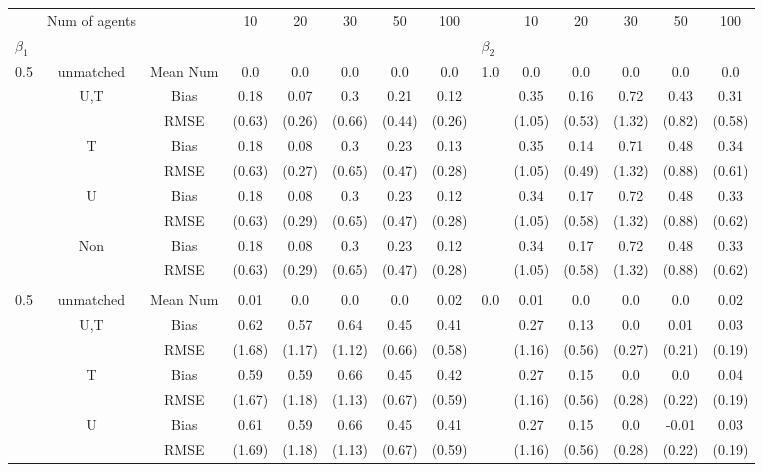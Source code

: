 \begin{tabular}{@{\extracolsep{5pt}}lc|cccccc|lccccc}
\toprule 
 & Num of agents &  & 10 & 20 & 30 & 50 & 100 &  & 10 & 20 & 30 & 50 & 100 \\
$\beta_1$ &  &  &  &  &  &  &  & $\beta_2$ &  &  &  &  &  \\
\midrule 
0.5 & unmatched & Mean Num & 0.0 & 0.0 & 0.0 & 0.0 & 0.0 & 1.0 & 0.0 & 0.0 & 0.0 & 0.0 & 0.0 \\
 & U,T & Bias & 0.18 & 0.07 & 0.3 & 0.21 & 0.12 &  & 0.35 & 0.16 & 0.72 & 0.43 & 0.31 \\
 &  & RMSE & (0.63) & (0.26) & (0.66) & (0.44) & (0.26) &  & (1.05) & (0.53) & (1.32) & (0.82) & (0.58) \\
 & T & Bias & 0.18 & 0.08 & 0.3 & 0.23 & 0.13 &  & 0.35 & 0.14 & 0.71 & 0.48 & 0.34 \\
 &  & RMSE & (0.63) & (0.27) & (0.65) & (0.47) & (0.28) &  & (1.05) & (0.49) & (1.32) & (0.88) & (0.61) \\
 & U & Bias & 0.18 & 0.08 & 0.3 & 0.23 & 0.12 &  & 0.34 & 0.17 & 0.72 & 0.48 & 0.33 \\
 &  & RMSE & (0.63) & (0.29) & (0.65) & (0.47) & (0.28) &  & (1.05) & (0.58) & (1.32) & (0.88) & (0.62) \\
 & Non & Bias & 0.18 & 0.08 & 0.3 & 0.23 & 0.12 &  & 0.34 & 0.17 & 0.72 & 0.48 & 0.33 \\
 &  & RMSE & (0.63) & (0.29) & (0.65) & (0.47) & (0.28) &  & (1.05) & (0.58) & (1.32) & (0.88) & (0.62) \\
 &  &  &  &  &  &  &  &  &  &  &  &  &  \\
0.5 & unmatched & Mean Num & 0.01 & 0.0 & 0.0 & 0.0 & 0.02 & 0.0 & 0.01 & 0.0 & 0.0 & 0.0 & 0.02 \\
 & U,T & Bias & 0.62 & 0.57 & 0.64 & 0.45 & 0.41 &  & 0.27 & 0.13 & 0.0 & 0.01 & 0.03 \\
 &  & RMSE & (1.68) & (1.17) & (1.12) & (0.66) & (0.58) &  & (1.16) & (0.56) & (0.27) & (0.21) & (0.19) \\
 & T & Bias & 0.59 & 0.59 & 0.66 & 0.45 & 0.42 &  & 0.27 & 0.15 & 0.0 & 0.0 & 0.04 \\
 &  & RMSE & (1.67) & (1.18) & (1.13) & (0.67) & (0.59) &  & (1.16) & (0.56) & (0.28) & (0.22) & (0.19) \\
 & U & Bias & 0.61 & 0.59 & 0.66 & 0.45 & 0.41 &  & 0.27 & 0.15 & 0.0 & -0.01 & 0.03 \\
 &  & RMSE & (1.69) & (1.18) & (1.13) & (0.67) & (0.59) &  & (1.16) & (0.56) & (0.28) & (0.22) & (0.19) \\

\end{tabular}
